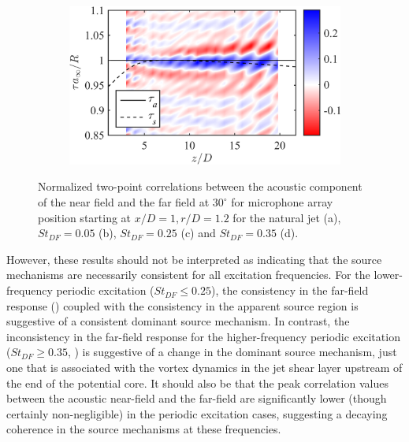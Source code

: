 \begin{figure}
\begin{subfigure}{.5\textwidth}
		\caption{}
		\label{fig:ch3_xcorrOA_St025}
	\end{subfigure}%
	\begin{subfigure}{.5\textwidth}
		\centering
		\includegraphics[width=0.95\linewidth]{Figures/ch3_St035_r120_ff30xcor_oa.png}
		\caption{}
		\label{fig:ch3_xcorrOA_St035}
	\end{subfigure}
	\caption{Normalized two-point correlations between the acoustic component of the near field and the far field at $30^\circ$ for microphone array position starting at $x/D = 1, r/D = 1.2$ for the natural jet (a), $St_{DF} = 0.05$ (b), $St_{DF} = 0.25$ (c) and $St_{DF} = 0.35$ (d).}
	\label{fig:ch3_xcorrOA}
\end{figure}

However, these results should not be interpreted as indicating that the source mechanisms are necessarily consistent for all excitation frequencies. 
For the lower-frequency periodic excitation ($St_{DF} \leq 0.25$), the consistency in the far-field response () coupled with the consistency in the apparent source region is suggestive of a consistent dominant source mechanism.
In contrast, the inconsistency in the far-field response for the higher-frequency periodic excitation ($St_{DF} \geq 0.35$, ) is suggestive of a change in the dominant source mechanism, just one that is associated with the vortex dynamics in the jet shear layer upstream of the end of the potential core.
It should also be that the peak correlation values between the acoustic near-field and the far-field are significantly lower (though certainly non-negligible) in the periodic excitation cases, suggesting a decaying coherence in the source mechanisms at these frequencies.


